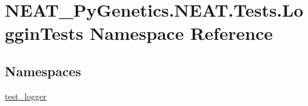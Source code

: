 \hypertarget{namespaceNEAT__PyGenetics_1_1NEAT_1_1Tests_1_1LogginTests}{}\section{N\+E\+A\+T\+\_\+\+Py\+Genetics.\+N\+E\+A\+T.\+Tests.\+Loggin\+Tests Namespace Reference}
\label{namespaceNEAT__PyGenetics_1_1NEAT_1_1Tests_1_1LogginTests}
\subsection*{Namespaces}
\begin{DoxyCompactItemize}
\item 
 \hyperlink{namespaceNEAT__PyGenetics_1_1NEAT_1_1Tests_1_1LogginTests_1_1test__logger}{test\+\_\+logger}
\end{DoxyCompactItemize}
